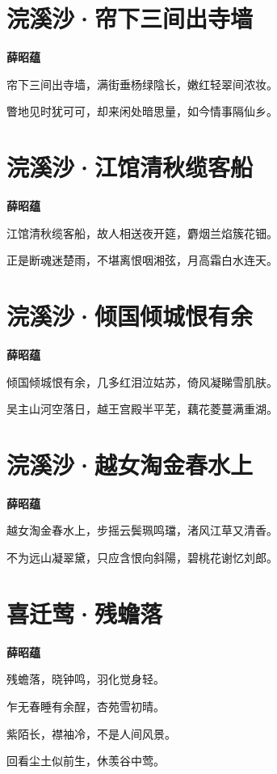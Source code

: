 \documentclass[12pt,a4paper]{ctexbook}
\begin{document}
\section{浣溪沙·帘下三间出寺墙}
\textbf{薛昭蕴}\par\vspace{0.5em}
帘下三间出寺墙，满街垂杨绿陰长，嫩红轻翠间浓妆。\par
瞥地见时犹可可，却来闲处暗思量，如今情事隔仙乡。\par

\section{浣溪沙·江馆清秋缆客船}
\textbf{薛昭蕴}\par\vspace{0.5em}
江馆清秋缆客船，故人相送夜开筵，麝烟兰焰簇花钿。\par
正是断魂迷楚雨，不堪离恨咽湘弦，月高霜白水连天。\par

\section{浣溪沙·倾国倾城恨有余}
\textbf{薛昭蕴}\par\vspace{0.5em}
倾国倾城恨有余，几多红泪泣姑苏，倚风凝睇雪肌肤。\par
吴主山河空落日，越王宫殿半平芜，藕花菱蔓满重湖。\par

\section{浣溪沙·越女淘金春水上}
\textbf{薛昭蕴}\par\vspace{0.5em}
越女淘金春水上，步摇云鬓珮鸣璫，渚风江草又清香。\par
不为远山凝翠黛，只应含恨向斜陽，碧桃花谢忆刘郎。\par

\section{喜迁莺·残蟾落}
\textbf{薛昭蕴}\par\vspace{0.5em}
残蟾落，晓钟鸣，羽化觉身轻。\par
乍无春睡有余酲，杏苑雪初晴。\par
紫陌长，襟袖冷，不是人间风景。\par
回看尘土似前生，休羡谷中莺。\par
\end{document}

